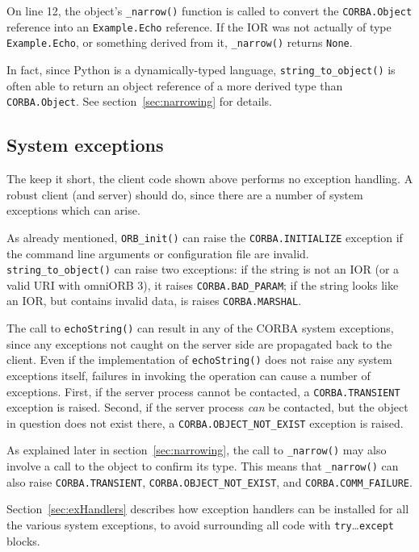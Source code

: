 \documentclass[draft,11pt,twoside,a4paper]{book}
\newcommand{\type}[1]{\texttt{#1}}
\newcommand{\code}[1]{\texttt{#1}}
\newcommand{\op}[1]{\texttt{#1()}}
\newcommand{\dsc}{\discretionary{}{}{}}
\begin{document}
On line 12, the object's \op{\_narrow} function is called to convert
the \type{CORBA.\dsc{}Object} reference into an \type{Example.Echo}
reference. If the IOR was not actually of type \type{Example.Echo}, or
something derived from it, \op{\_narrow} returns \code{None}.

In fact, since Python is a dynamically-typed language,
\op{string\_to\_object} is often able to return an object reference of
a more derived type than \type{CORBA.\dsc{}Object}. See
section~\ref{sec:narrowing} for details.

\vspace{\baselineskip}%


\subsection{System exceptions}

The keep it short, the client code shown above performs no exception
handling. A robust client (and server) should do, since there are a
number of system exceptions which can arise.

As already mentioned, \op{ORB\_init} can raise the
\code{CORBA.INITIALIZE} exception if the command line arguments or
configuration file are invalid.  \op{string\_to\_\dsc{}object} can
raise two exceptions: if the string is not an IOR (or a valid URI with
omniORB 3), it raises \code{CORBA.BAD\_PARAM}; if the string looks
like an IOR, but contains invalid data, is raises
\code{CORBA.MARSHAL}.

The call to \op{echoString} can result in any of the CORBA system
exceptions, since any exceptions not caught on the server side are
propagated back to the client. Even if the implementation of
\op{echoString} does not raise any system exceptions itself, failures
in invoking the operation can cause a number of exceptions. First, if
the server process cannot be contacted, a \code{CORBA.TRANSIENT}
exception is raised. Second, if the server process \emph{can} be
contacted, but the object in question does not exist there, a
\code{CORBA.OBJECT\_NOT\_EXIST} exception is raised.

As explained later in section~\ref{sec:narrowing}, the call to
\op{\_narrow} may also involve a call to the object to confirm its
type. This means that \op{\_narrow} can also raise
\code{CORBA.TRANSIENT}, \code{CORBA.OBJECT\_NOT\_EXIST}, and
\code{CORBA.COMM\_FAILURE}.

Section~\ref{sec:exHandlers} describes how exception handlers can be
installed for all the various system exceptions, to avoid surrounding
all code with \code{try}\dots\code{except} blocks.
\end{document}

